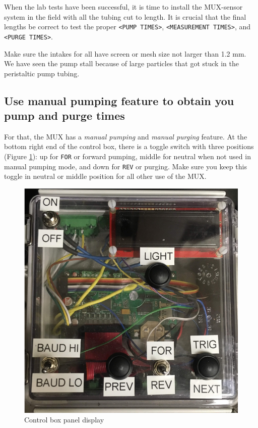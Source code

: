 \documentclass[]{book}
\begin{document}
When the lab tests have been successful, it is time to install the MUX-sensor system in the field with all the tubing cut to length. It is crucial that the final lengths be correct to test the proper \texttt{\textless{}PUMP\ TIMES\textgreater{}}, \texttt{\textless{}MEASUREMENT\ TIMES\textgreater{}}, and \texttt{\textless{}PURGE\ TIMES\textgreater{}}.

Make sure the intakes for all have screen or mesh size not larger than 1.2 mm. We have seen the pump stall because of large particles that got stuck in the peristaltic pump tubing.

\hypertarget{use-manual-pumping-feature-to-obtain-you-pump-and-purge-times}{%
\subsection{Use manual pumping feature to obtain you pump and purge times}\label{use-manual-pumping-feature-to-obtain-you-pump-and-purge-times}}

For that, the MUX has a \emph{manual pumping} and \emph{manual purging} feature. At the bottom right end of the control box, there is a toggle switch with three positions (Figure \ref{fig:ControlLabel1}): up for \texttt{FOR} or forward pumping, middle for neutral when not used in manual pumping mode, and down for \texttt{REV} or purging. Make sure you keep this toggle in neutral or middle position for all other use of the MUX.

\begin{figure}

{\centering \includegraphics[width=0.6\linewidth]{pictures/ControlLabel} 

}

\caption{Control box panel display}\label{fig:ControlLabel1}
\end{figure}
\end{document}
